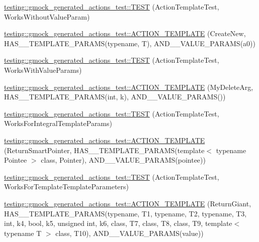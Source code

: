\begin{DoxyCompactItemize}
\hyperlink{namespacetesting_1_1gmock__generated__actions__test_aaac879cbe00638dcc2d4733760180a4f}{testing\+::gmock\+\_\+generated\+\_\+actions\+\_\+test\+::\+T\+E\+ST} (Action\+Template\+Test, Works\+Without\+Value\+Param)
\item 
\hyperlink{namespacetesting_1_1gmock__generated__actions__test_a38fb8047f95126bb0b2cfe7e670c8af7}{testing\+::gmock\+\_\+generated\+\_\+actions\+\_\+test\+::\+A\+C\+T\+I\+O\+N\+\_\+\+T\+E\+M\+P\+L\+A\+TE} (Create\+New, H\+A\+S\+\_\+\_\+\+T\+E\+M\+P\+L\+A\+T\+E\+\_\+\+P\+A\+R\+A\+MS(typename, T), A\+N\+D\+\_\+\_\+\+V\+A\+L\+U\+E\+\_\+\+P\+A\+R\+A\+MS(a0))
\item 
\hyperlink{namespacetesting_1_1gmock__generated__actions__test_a21f6e2ad5c4c1afecca93a42c9a84f1a}{testing\+::gmock\+\_\+generated\+\_\+actions\+\_\+test\+::\+T\+E\+ST} (Action\+Template\+Test, Works\+With\+Value\+Params)
\item 
\hyperlink{namespacetesting_1_1gmock__generated__actions__test_aaaac0fbf0bf2c7bd8fc104310e6af25c}{testing\+::gmock\+\_\+generated\+\_\+actions\+\_\+test\+::\+A\+C\+T\+I\+O\+N\+\_\+\+T\+E\+M\+P\+L\+A\+TE} (My\+Delete\+Arg, H\+A\+S\+\_\+\_\+\+T\+E\+M\+P\+L\+A\+T\+E\+\_\+\+P\+A\+R\+A\+MS(int, k), A\+N\+D\+\_\+\_\+\+V\+A\+L\+U\+E\+\_\+\+P\+A\+R\+A\+MS())
\item 
\hyperlink{namespacetesting_1_1gmock__generated__actions__test_aad8d77a35ac21f366dc334a45cf5b140}{testing\+::gmock\+\_\+generated\+\_\+actions\+\_\+test\+::\+T\+E\+ST} (Action\+Template\+Test, Works\+For\+Integral\+Template\+Params)
\item 
\hyperlink{namespacetesting_1_1gmock__generated__actions__test_ad99d926be507eb0c031538da2e8bb838}{testing\+::gmock\+\_\+generated\+\_\+actions\+\_\+test\+::\+A\+C\+T\+I\+O\+N\+\_\+\+T\+E\+M\+P\+L\+A\+TE} (Return\+Smart\+Pointer, H\+A\+S\+\_\+\_\+\+T\+E\+M\+P\+L\+A\+T\+E\+\_\+\+P\+A\+R\+A\+MS(template$<$ typename Pointee $>$ class, Pointer), A\+N\+D\+\_\+\_\+\+V\+A\+L\+U\+E\+\_\+\+P\+A\+R\+A\+MS(pointee))
\item 
\hyperlink{namespacetesting_1_1gmock__generated__actions__test_a8908d6badc9054adebdaf5ed8d455c2d}{testing\+::gmock\+\_\+generated\+\_\+actions\+\_\+test\+::\+T\+E\+ST} (Action\+Template\+Test, Works\+For\+Template\+Template\+Parameters)
\item 
\hyperlink{namespacetesting_1_1gmock__generated__actions__test_aea61dba8f93605f3e8c1cdedfd1079f5}{testing\+::gmock\+\_\+generated\+\_\+actions\+\_\+test\+::\+A\+C\+T\+I\+O\+N\+\_\+\+T\+E\+M\+P\+L\+A\+TE} (Return\+Giant, H\+A\+S\+\_\+\_\+\+T\+E\+M\+P\+L\+A\+T\+E\+\_\+\+P\+A\+R\+A\+MS(typename, T1, typename, T2, typename, T3, int, k4, bool, k5, unsigned int, k6, class, T7, class, T8, class, T9, template$<$ typename T $>$ class, T10), A\+N\+D\+\_\+\_\+\+V\+A\+L\+U\+E\+\_\+\+P\+A\+R\+A\+MS(value))

\end{DoxyCompactItemize}
